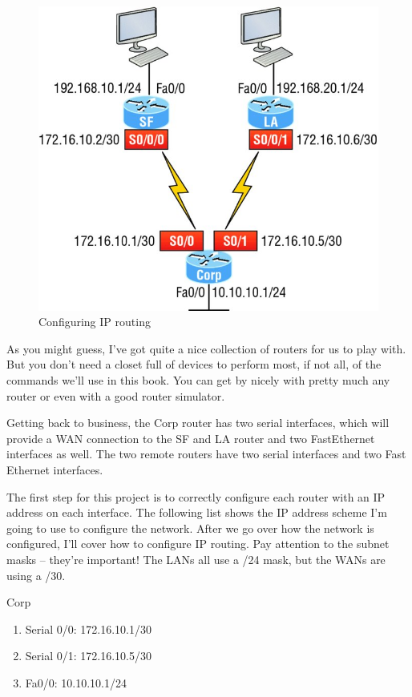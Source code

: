 \begin{figure}
   \centering
   \includegraphics{images/c09f008.jpg}
   \caption{Configuring IP routing}
   \label{fig:config-ip-routing}
\end{figure}

As you might guess, I've got quite a nice collection of routers for us
to play with. But you don't need a closet full of devices to perform
most, if not all, of the commands we'll use in this book. You can get by
nicely with pretty much any router or even with a good router simulator.

Getting back to business, the Corp router has two serial interfaces,
which will provide a WAN connection to the SF and LA router and two FastEthernet interfaces as well.
The two remote routers have two serial interfaces and two Fast Ethernet interfaces.

The first step for this project is to correctly configure each router with an IP address on each interface.
The following list shows the IP address scheme I'm going to use to configure the network.
After we go over how the network is configured, I'll cover how to configure IP routing.
Pay attention to the subnet masks -- they're important!
The LANs all use a /24 mask, but the WANs are using a /30.

Corp

\begin{enumerate}
\item
  Serial 0/0: 172.16.10.1/30
\item
  Serial 0/1: 172.16.10.5/30
\item
  Fa0/0: 10.10.10.1/24
\end{enumerate}

